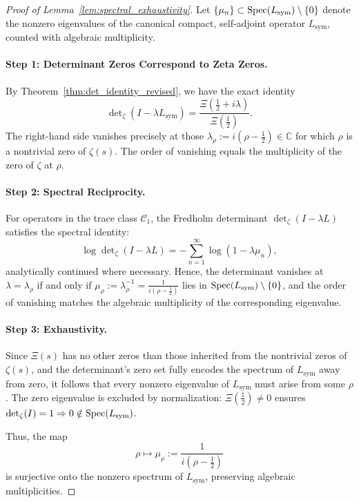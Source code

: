 \begin{proof}[Proof of Lemma~\ref{lem:spectral_exhaustivity}]
Let \( \{ \mu_n \} \subset \operatorname{Spec}(L_{\mathrm{sym}}) \setminus \{0\} \) denote the nonzero eigenvalues of the canonical compact, self-adjoint operator \( L_{\mathrm{sym}} \), counted with algebraic multiplicity.

\paragraph{Step 1: Determinant Zeros Correspond to Zeta Zeros.}
By Theorem~\ref{thm:det_identity_revised}, we have the exact identity
\[
\det\nolimits_\zeta(I - \lambda L_{\mathrm{sym}}) = \frac{\Xi(\tfrac{1}{2} + i\lambda)}{\Xi(\tfrac{1}{2})}.
\]
The right-hand side vanishes precisely at those \( \lambda_\rho := i(\rho - \tfrac{1}{2}) \in \mathbb{C} \) for which \( \rho \) is a nontrivial zero of \( \zeta(s) \). The order of vanishing equals the multiplicity of the zero of \( \zeta \) at \( \rho \).

\paragraph{Step 2: Spectral Reciprocity.}
For operators in the trace class \( \mathcal{C}_1 \), the Fredholm determinant \(\det_\zeta(I - \lambda L)\) satisfies the spectral identity:
\[
\log \det\nolimits_\zeta(I - \lambda L) = -\sum_{n=1}^\infty \log(1 - \lambda \mu_n),
\]
analytically continued where necessary. Hence, the determinant vanishes at \( \lambda = \lambda_\rho \) if and only if \( \mu_\rho := \lambda_\rho^{-1} = \frac{1}{i(\rho - \tfrac{1}{2})} \) lies in \( \operatorname{Spec}(L_{\mathrm{sym}}) \setminus \{0\} \), and the order of vanishing matches the algebraic multiplicity of the corresponding eigenvalue.

\paragraph{Step 3: Exhaustivity.}
Since \( \Xi(s) \) has no other zeros than those inherited from the nontrivial zeros of \( \zeta(s) \), and the determinant’s zero set fully encodes the spectrum of \( L_{\mathrm{sym}} \) away from zero, it follows that every nonzero eigenvalue of \( L_{\mathrm{sym}} \) must arise from some \( \rho \). The zero eigenvalue is excluded by normalization: \(\Xi(\tfrac{1}{2}) \neq 0\) ensures \(\det_\zeta(I) = 1 \Rightarrow 0 \notin \operatorname{Spec}(L_{\mathrm{sym}})\).

\medskip
\noindent
Thus, the map
\[
\rho \mapsto \mu_\rho := \frac{1}{i(\rho - \tfrac{1}{2})}
\]
is surjective onto the nonzero spectrum of \( L_{\mathrm{sym}} \), preserving algebraic multiplicities.
\end{proof}
%  